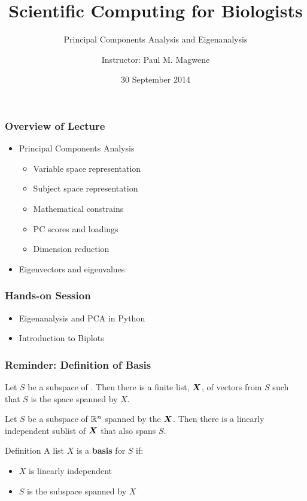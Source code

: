 \documentclass{beamer}
\title{Scientific Computing for Biologists}
\subtitle{Principal Components Analysis and Eigenanalysis} %
\author{Instructor: Paul M. Magwene}
\date{30 September 2014}
\begin{document}
\begin{frame}
\titlepage
\end{frame}

\begin{frame}
  \frametitle{Overview of Lecture}
  
\begin{itemize}
		\item Principal Components Analysis
		\begin{itemize}
			\item Variable space representation
			\item Subject space representation
			\item Mathematical constrains
			\item PC scores and loadings
			\item Dimension reduction			
		\end{itemize}		
		\item Eigenvectors and eigenvalues	
\end{itemize}

\end{frame}

\begin{frame}
  \frametitle{Hands-on Session}
\begin{itemize}
    \item Eigenanalysis and PCA in Python
    \item Introduction to Biplots
\end{itemize} 


\end{frame}		




\begin{frame}
  \frametitle{Reminder: Definition of Basis}

Let $S$ be a subspace of \RealN.  Then there is a finite list, $\bm{X}$, of vectors from $S$ such that $S$ is the space spanned by $X$.
\medskip

Let $S$ be a subspace of $\mathbb{R}^n$ spanned by the $\bm{X}$. Then  there is a linearly independent sublist of $\bm{X}$ that also spans $S$.
\medskip

\begin{block}{Definition}
A list $X$ is a \textbf{basis} for $S$ if:
\begin{itemize}
\item $X$ is linearly independent
\item $S$ is the subspace spanned by $X$
\end{itemize}
\end{block}

\end{frame}
\end{document}

